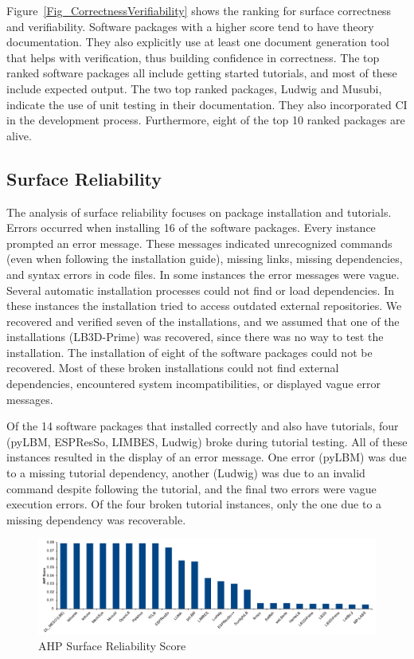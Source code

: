 \documentclass[final, 3p, times, authoryear]{elsarticle}
\newcommand{\esp}{ESPResSo\nolinebreak\hspace{-.05em}\raisebox{.4ex}{\small\bf
+}\nolinebreak\hspace{-.10em}\raisebox{.4ex}{\small\bf +}}
\begin{document}
Figure~\ref{Fig_CorrectnessVerifiability} shows the ranking for surface
correctness and verifiability. Software packages with a higher score tend to
have theory documentation. They also explicitly use at least one document
generation tool that helps with verification, thus building confidence in
correctness. The top ranked software packages all include getting started
tutorials, and most of these include expected output. The two top ranked
packages, Ludwig and Musubi, indicate the use of unit testing in their
documentation. They also incorporated CI in the development process.
Furthermore, eight of the top 10 ranked packages are alive.

\subsection{Surface Reliability}

The analysis of surface reliability focuses on package installation and
tutorials. Errors occurred when installing 16 of the software packages. Every
instance prompted an error message. These messages indicated unrecognized
commands (even when following the installation guide), missing links, missing
dependencies, and syntax errors in code files. In some instances the error
messages were vague. Several automatic installation processes could not find or
load dependencies. In these instances the installation tried to access outdated
external repositories. We recovered and verified seven of the installations, and
we assumed that one of the installations (LB3D-Prime) was recovered, since there
was no way to test the installation. The installation of eight of the software
packages could not be recovered. Most of these broken installations could not
find external dependencies, encountered system incompatibilities, or displayed
vague error messages.

Of the 14 software packages that installed correctly and also have tutorials,
four (pyLBM, \esp, LIMBES, Ludwig) broke during tutorial testing. All of these
instances resulted in the display of an error message. One error (pyLBM) was due
to a missing tutorial dependency, another (Ludwig) was due to an invalid command
despite following the tutorial, and the final two errors were vague execution
errors. Of the four broken tutorial instances, only the one due to a missing
dependency was recoverable. 

\begin{figure}[h!]
	\begin{center}
		\includegraphics[width=1.0\textwidth]{./figures/reliability_chart.pdf}
		\caption{AHP Surface Reliability Score}
		\label{Fig_Reliability}
	\end{center}
\end{figure}
\end{document}
